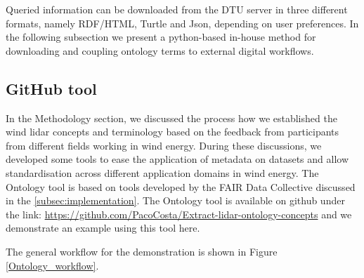 \documentclass[remotesensing,article,submit,pdftex,moreauthors]{Definitions/mdpi}
\begin{document}
Queried information can be downloaded from the DTU server in three different formats, namely RDF/HTML, Turtle and Json, depending on user preferences. In the following subsection we present a python-based in-house method for downloading and coupling ontology terms to external digital workflows. 

    




\subsection{GitHub tool}
\label{GitTool}

In the Methodology section, we discussed the process how we established the wind lidar concepts and terminology based on the feedback from participants from different fields working in wind energy. During these discussions, we developed some tools to ease the application of metadata on datasets and allow standardisation across different application domains in wind energy. The Ontology tool is based on tools developed by the FAIR Data Collective discussed in the \ref{subsec:implementation}. The Ontology tool is available on github under the link: \href{https://github.com/PacoCosta/Extract-lidar-ontology-concepts}{https://github.com/PacoCosta/Extract-lidar-ontology-concepts} and we demonstrate an example using this tool here.

The general workflow for the demonstration is shown in Figure \ref{Ontology_workflow}.
\end{document}
